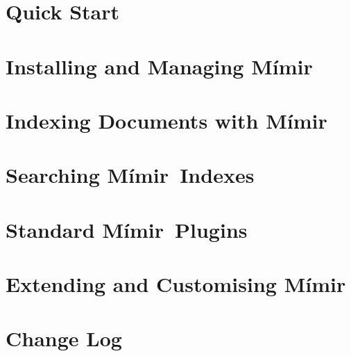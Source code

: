 \documentclass[10pt, a4paper, twoside]{report}
\newcommand{\Mimir}{M\'{i}mir}
\begin{document}
\chapter{Quick Start}\label{sec:quickstart}


\chapter{Installing and Managing \Mimir}\label{sec:admin}

\chapter{Indexing Documents with \Mimir}\label{sec:indexing}

\chapter{Searching \Mimir\ Indexes}\label{sec:searching}

\chapter{Standard \Mimir\ Plugins}\label{sec:plugins}

\chapter{Extending and Customising \Mimir}\label{sec:extend}


\appendix
\chapter{Change Log}\label{sec:changes}

\end{document}
